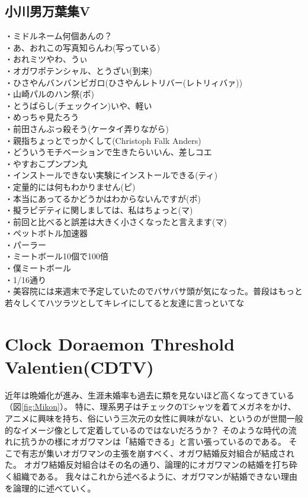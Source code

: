 \subsection{小川男万葉集V}
・ミドルネーム何個あんの？\\
・あ、おれこの写真知らんわ(写っている)\\
・おれミツやわ、うぃ\\
・オガワポテンシャル、とうざい(到来)\\
・ひさやんバンバンビガロ(ひさやんレトリバー(レトリィバァ))\\
・山崎パルのハン祭(ポ)\\
・とうばらし(チェックイン)いや、軽い\\
・めっちゃ見たろう\\
・前田さんぶっ殺そう(ケータイ弄りながら)\\
・親指ちょっとでっかくして(Christoph Falk Anders)\\
・どういうモチベーションで生きたらいいん、差しコエ\\
・やすおこプンプン丸\\
・インストールできない実験にインストールできる(ティ)\\
・定量的には何もわかりません(ピ)\\
・本当にあってるかどうかはわからないんですが(ポ)\\
・擬ラピデティに関しましては、私はちょっと(マ)\\
・前回と比べると誤差は大きく小さくなったと言えます(マ)\\
・ペットボトル加速器\\
・パーラー\\
・ミートボール10個で100倍\\
・僕ミートボール\\
・1/16通り\\
・美容院には来週末で予定していたのでバサバサ頭が気になった。普段はもっと若々しくてハツラツとしてキレイにしてると友達に言っといてな\\


\newpage
\section{Clock Doraemon Threshold Valentien(CDTV)}
近年は晩婚化が進み、生涯未婚率も過去に類を見ないほど高くなってきている（図\ref{fig:Mikon}）。
特に、理系男子はチェックのTシャツを着てメガネをかけ、アニメに興味を持ち、俗にいう三次元の女性に興味がない、というのが世間一般的なイメージ像として定着しているのではないだろうか？
そのような時代の流れに抗うかの様にオガワマンは「結婚できる」と言い張っているのである。
そこで有志が集いオガワマンの主張を崩すべく、オガワ結婚反対組合が結成された。
オガワ結婚反対組合はその名の通り、論理的にオガワマンの結婚を打ち砕く組織である。
我々はこれから述べるように、オガワマンが結婚できない理由を論理的に述べていく。

